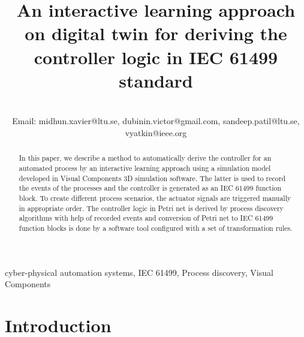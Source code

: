 \documentclass[conference]{IEEEtran}
\begin{document}
\title{An interactive learning approach on digital twin for deriving the controller logic  in IEC 61499 standard}

\author{







\\ Email: midhun.xavier@ltu.se, dubinin.victor@gmail.com, sandeep.patil@ltu.se, vyatkin@ieee.org
}


\maketitle

\begin{abstract}

In this paper, we describe a method to automatically derive the controller for an automated process by an interactive learning approach using a simulation model developed in Visual Components 3D simulation software. The latter is used to record the events of the processes and the controller is generated as an IEC 61499 function block. To create different process scenarios, the actuator signals are triggered manually in appropriate order. The controller logic in Petri net is derived by process discovery algorithms with help of recorded events and conversion of Petri net to IEC 61499 function blocks is done by a software tool configured with a set of transformation rules.

\end{abstract}

\begin{IEEEkeywords}
cyber-physical automation systems,  IEC 61499, Process discovery, Visual Components
\end{IEEEkeywords}


\section{Introduction}
\end{document}
